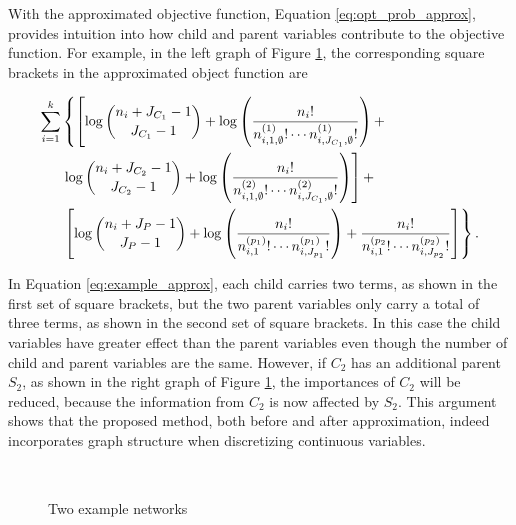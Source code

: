 With the approximated objective function, Equation \ref{eq:opt_prob_approx}, provides intuition into how child and parent variables contribute to the objective function.
For example, in the left graph of Figure \ref{fig:example_networks}, the corresponding square brackets in the approximated object function are

\begin{equation}
\begin{aligned}
\label{eq:example_approx}
 \sum_{i=1}^k & \left\lbrace   \left[ \log{{n_{i} + J_{C_1} - 1}\choose{J_{C_1}-1}} + \log \left(  {{{n_i}!} \over { {n^{(1)}_{i,1,\emptyset} !} \cdots {n^{(1)}_{i,J_{C_1},\emptyset} !}} }  \right)  +  \right. \right.\\
& \left.  \log{{n_{i} + J_{C_2} - 1}\choose{J_{C_2}-1}} + \log \left(  {{{n_i}!} \over { {n^{(2)}_{i,1,\emptyset} !} \cdots {n^{(2)}_{i,J_{C_1},\emptyset} !}} }  \right)  \right] + \\
&  \left. \left[  \log {{n_{i} + J_P - 1}\choose{J_P-1}} +  \log \left( { {{{n}_i}!}\over{ {n^{(p_1)}_{i,1} !}\cdots {n^{(p_1)}_{i,J_{p_1}} !}}} \right) +{ {{{n}_i}!}\over{ {n^{(p_2}_{i,1} !}\cdots {n^{(p_2)}_{i,J_{p_2}} !}}}  \right] \right\rbrace \text{.}
\end{aligned}
\end{equation}


In Equation \ref{eq:example_approx}, each child carries two terms, as shown in the first set of square brackets, but the two parent variables only carry a total of three terms, as shown in the second set of square brackets.
In this case the child variables have greater effect than the parent variables even though the number of child and parent variables are the same.
However, if $C_2$ has an additional parent $S_2$, as shown in the right graph of Figure \ref{fig:example_networks}, the importances of $C_2$ will be reduced, because the information from $C_2$ is now affected by $S_2$.
This argument shows that the proposed method, both before and after approximation, indeed incorporates graph structure when discretizing continuous variables.

\begin{figure}[ht]
  \label{fig:example_networks}
    \begin{tabular}{cc}
      
      \end{tabular}
     \hspace{5em}
      \begin{tabular}{cc}
      
    \end{tabular}
  \caption{Two example networks}
\end{figure}

